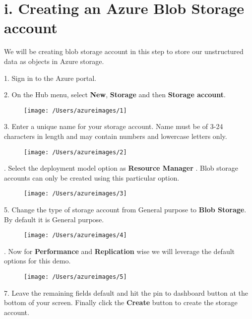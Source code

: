 \documentclass[12pt, letterpaper, twoside]{article}
\begin{document}
\section*{i. Creating an Azure Blob Storage account}	
We will be creating blob storage account in this step to store our unstructured data as objects in Azure storage. \par
\vspace{0.5cm}
1. Sign in to the Azure portal. \par
\vspace{0.5cm}
2. On the Hub menu, select \textbf{New}, \textbf{Storage} and then \textbf{Storage account}.
\begin{figure}[H]
	\centering
	\texttt{[image: /Users/azureimages/1]}
\end{figure}
3. Enter a unique name for your storage account. Name must be of 3-24 \indent characters in length and may contain numbers and lowercase letters only. 
\begin{figure}[H]
	\centering
	\texttt{[image: /Users/azureimages/2]}
\end{figure}
. Select the deployment model option as \textbf{Resource Manager} . Blob \indent storage accounts can only be created using this particular option. 
\begin{figure}[H]
	\centering
	\texttt{[image: /Users/azureimages/3]}
\end{figure}
5. Change the type of storage account from General purpose to \textbf{Blob \indent Storage}. By default it is General purpose.
\begin{figure}[H]
	\centering
	\texttt{[image: /Users/azureimages/4]}
\end{figure}
. Now for \textbf{Performance} and \textbf{Replication} wise we will leverage the \indent default options for this demo.
\begin{figure}[H]
	\centering
	\texttt{[image: /Users/azureimages/5]}
\end{figure}
7. Leave the remaining fields default and hit the pin to dashboard button \indent at the bottom of your screen. Finally click the \textbf{Create} button to create \indent the storage account.  
\clearpage
\end{document}
